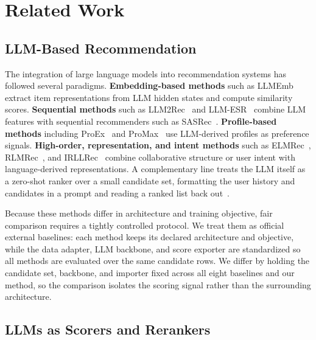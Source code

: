 \section{Related Work}
\label{sec:related}

\subsection{LLM-Based Recommendation}

The integration of large language models into recommendation systems has
followed several paradigms. \textbf{Embedding-based methods} such as
LLMEmb~\cite{llmemb} extract item representations from LLM hidden states and
compute similarity scores. \textbf{Sequential methods} such as
LLM2Rec~\cite{llm2rec} and LLM-ESR~\cite{llmesr} combine LLM features with
sequential recommenders such as SASRec~\cite{sasrec}. \textbf{Profile-based
methods} including ProEx~\cite{proex} and ProMax~\cite{promax} use LLM-derived
profiles as preference signals. \textbf{High-order, representation, and intent
methods} such as ELMRec~\cite{elmrec}, RLMRec~\cite{rlmrec}, and
IRLLRec~\cite{irllrec} combine collaborative structure or user intent with
language-derived representations. A complementary line treats the LLM itself as
a zero-shot ranker over a small candidate set, formatting the user history and
candidates in a prompt and reading a ranked list back out~\cite{llmrank}.

Because these methods differ in architecture and training objective, fair
comparison requires a tightly controlled protocol. We treat them as official
external baselines: each method keeps its declared architecture and objective,
while the data adapter, LLM backbone, and score exporter are standardized so
all methods are evaluated over the same candidate rows.
We differ by holding the candidate set, backbone, and importer fixed across all
eight baselines and our method, so the comparison isolates the scoring signal
rather than the surrounding architecture.

\subsection{LLMs as Scorers and Rerankers}

